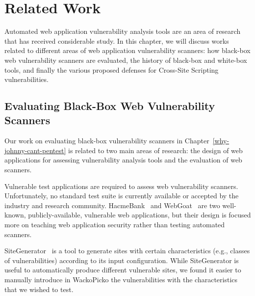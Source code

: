 \chapter{Related Work}

Automated web application vulnerability analysis tools are an area of
research that has received considerable study. In this chapter, we
will discuss works related to different areas of web application
vulnerability scanners: how black-box web vulnerability scanners are
evaluated, the history of black-box and white-box tools, and finally
the various proposed defenses for Cross-Site Scripting
vulnerabilities.

\section{Evaluating Black-Box Web Vulnerability Scanners}
\label{sec:related_work}

Our work on evaluating black-box vulnerability scanners in
Chapter~\ref{why-johnny-cant-pentest} is related to two main areas of
research: the design of web applications for assessing vulnerability
analysis tools and the evaluation of web scanners.

 Vulnerable test
applications are required to assess web vulnerability scanners.
Unfortunately, no standard test suite is currently available or
accepted by the industry and research community.
HacmeBank~\cite{hacme_bank} and Web\-Goat~\cite{owasp-webgoat} are two
well-known, publicly-available, vulnerable web applications, but their
design is focused more on teaching web application security rather
than testing automated scanners.

SiteGenerator~\cite{owasp_sitegenerator} is a tool to generate sites
with certain characteristics (e.g., classes of vulnerabilities)
according to its input configuration. While SiteGenerator is useful to
automatically produce different vulnerable sites, we found it easier
to manually introduce in Wacko\-Picko the vulnerabilities with the
characteristics that we wished to test.

